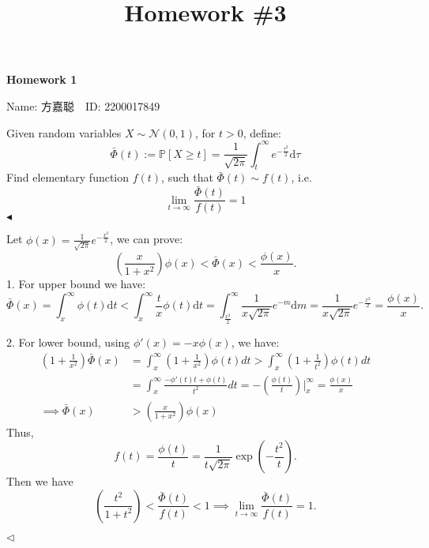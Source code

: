 \documentclass[11pt]{article}
\title{Homework \#3}
\newenvironment{problem}[2][Problem]{\begin{trivlist}
\item[\hskip \labelsep {\bfseries #1}\hskip \labelsep {\bfseries #2.}]}{\hfill$\blacktriangleleft$\end{trivlist}}
\newenvironment{answer}[1][Solution]{\begin{trivlist}
\item[\hskip \labelsep {\bfseries #1.}\hskip \labelsep]}{\hfill$\lhd$\end{trivlist}}
\newcommand\1{\mathds{1}}
\newcommand\dd{\mathrm{d}}
\begin{document}
\kaishu

\pagestyle{fancy}
\chead{}



\begin{center}
    {\LARGE \bf Homework 1}

    {Name: 方嘉聪\ \  ID: 2200017849}            %
\end{center}

\begin{problem}{1}
    Given random variables $\displaystyle X\sim \mathcal{N}(0,1)$, for $\displaystyle t>0$, define:$$\bar{\Phi}(t):=\mathbb{P}\left[X\geq t\right] = \frac{1}{\sqrt{ 2\pi }}\int_{t}^\infty e^{-\frac{\tau^2}{2}}\dd\tau$$Find elementary function $\displaystyle f(t)$, such that $\displaystyle \bar{\Phi}(t)\sim f(t)$, i.e. $$\lim_{ t \to \infty } \frac{\bar{\Phi}(t)}{f(t)}= 1$$
\end{problem}

\begin{answer}
    Let $\displaystyle \phi(x) = \frac{1}{\sqrt{ 2\pi }}e^{-\frac{x^2}{2}}$, we can prove: $$\left(\frac{x}{1+x^2}\right)\phi(x) < \bar{\Phi}(x) < \frac{\phi(x)}{x}.$$
    1. For upper bound we have: $$\bar{\Phi}(x) = \int_{x}^\infty \phi(t)\dd t < \int_{x}^\infty \frac{t}{x}\phi(t)\dd t = \int_{\frac{x^2}{2}}^\infty \frac{1}{x\sqrt{ 2\pi }}e^{-m}\dd m = \frac{1}{x\sqrt{ 2\pi }}e^{-\frac{x^2}{2}} = \frac{\phi(x)}{x}.$$
    
    2. For lower bound, using $\displaystyle \phi'(x) = -x\phi(x)$, we have: 
    \begin{align*}
        \left(1 + \frac{1}{x^2}\right)\bar{\Phi}(x) &= \int_{x}^\infty \left(1+\frac{1}{x^2}\right)\phi(t)d t > \int_{x}^\infty \left(1+\frac{1}{t^2}\right)\phi(t)d t \\
        &= \int_{x}^\infty \frac{-\phi'(t) t + \phi(t)}{t^2}d t = -\left(\frac{\phi(t)}{t}\right)\bigg|_{x}^\infty = \frac{\phi(x)}{x} \\
        \implies \bar{\Phi}(x) &> \left(\frac{x}{1+x^2}\right)\phi(x)
    \end{align*}
    Thus, $$f(t) = \frac{\phi(t)}{t} = \frac{1}{t\sqrt{ 2\pi }}\exp\left(-\frac{t^2}{t}\right).$$Then we have $$\left(\frac{t^2}{1+t^2}\right) < \frac{\bar{\Phi}(t)}{f(t)} < 1 \implies \lim_{ t \to \infty } \frac{\bar{\Phi}(t)}{f(t)}= 1.$$
        
\end{answer}
\end{document}
